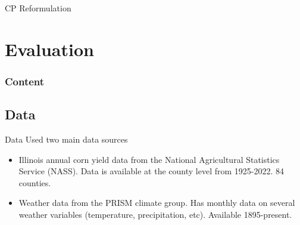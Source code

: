 \documentclass{beamer}
\begin{document}
\begin{frame}{CP Reformulation}
\end{frame}

\section{Evaluation}
\begin{frame}
    \frametitle{Content}
    \tableofcontents[currentsection]
  \end{frame}
\subsection{Data}
\begin{frame}{Data}
    Used two main data sources
    \begin{itemize}
        \setlength\itemsep{2em}
        \item Illinois annual corn yield data from the National Agricultural Statistics Service (NASS). Data is available at the county level from 1925-2022. 84 counties. 
        \item Weather data from the PRISM climate group. Has monthly data on several weather variables (temperature, precipitation, etc). Available 1895-present.
    \end{itemize}
\end{frame}
\end{document}
